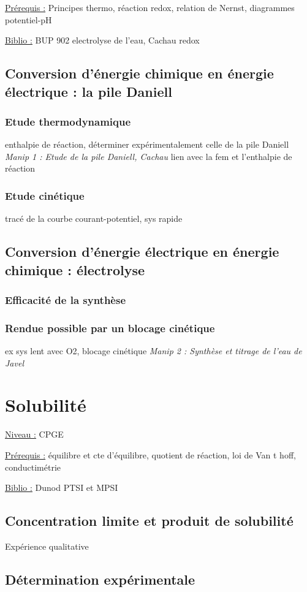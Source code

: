 \documentclass{article}%
\begin{document}
\underline{Prérequis :} Principes thermo, réaction redox, relation de Nernst, diagrammes potentiel-pH

\underline{Biblio :} BUP 902 electrolyse de l'eau, Cachau redox

\subsection{Conversion d'énergie chimique en énergie électrique : la pile Daniell}
\subsubsection{Etude thermodynamique}
enthalpie de réaction, déterminer expérimentalement celle de la pile Daniell
\textit{Manip 1 : Etude de la pile Daniell, Cachau}
lien avec la fem et l'enthalpie de réaction
\subsubsection{Etude cinétique}
tracé de la courbe courant-potentiel, sys rapide
\subsection{Conversion d'énergie électrique en énergie chimique : électrolyse}
\subsubsection{Efficacité de la synthèse}
\subsubsection{Rendue possible par un blocage cinétique}
ex sys lent avec O2, blocage cinétique
\textit{Manip 2 : Synthèse et titrage de l'eau de Javel}
\section{Solubilité}
\underline{Niveau :} CPGE 

\underline{Prérequis :} équilibre et cte d'équilibre, quotient de réaction, loi de Van t hoff, conductimétrie 

\underline{Biblio :} Dunod PTSI et MPSI

\subsection{Concentration limite et produit de solubilité}
Expérience qualitative
\subsection{Détermination expérimentale}
\end{document}

